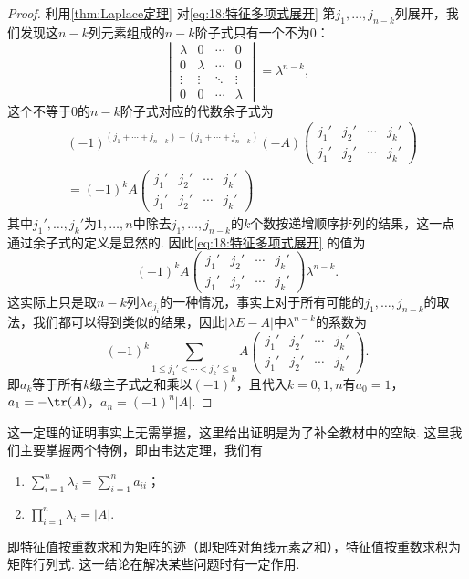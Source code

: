 \begin{proof}
    利用\autoref{thm:Laplace定理} 对\autoref{eq:18:特征多项式展开} 第$j_1,\ldots,j_{n-k}$列展开，我们发现这$n-k$列元素组成的$n-k$阶子式只有一个不为0：
    \[\begin{vmatrix}
            \lambda & 0       & \cdots & 0       \\
            0       & \lambda & \cdots & 0       \\
            \vdots  & \vdots  & \ddots & \vdots  \\
            0       & 0       & \cdots & \lambda
        \end{vmatrix}=\lambda^{n-k},\]
    这个不等于0的$n-k$阶子式对应的代数余子式为
    \begin{align*}
         & (-1)^{(j_1+\cdots+j_{n-k})+(j_1+\cdots+j_{n-k})}(-A)
        \begin{pmatrix}
            j_1' & j_2' & \cdots & j_k' \\
            j_1' & j_2' & \cdots & j_k'
        \end{pmatrix}                             \\
         & = (-1)^kA\begin{pmatrix}
                        j_1' & j_2' & \cdots & j_k' \\
                        j_1' & j_2' & \cdots & j_k'
                    \end{pmatrix}
    \end{align*}
    其中$j_1',\ldots,j_k'$为$1,\ldots,n$中除去$j_1,\ldots,j_{n-k}$的$k$个数按递增顺序排列的结果，这一点通过余子式的定义是显然的. 因此\autoref{eq:18:特征多项式展开} 的值为
    \[(-1)^kA\begin{pmatrix}
            j_1' & j_2' & \cdots & j_k' \\
            j_1' & j_2' & \cdots & j_k'
        \end{pmatrix}\lambda^{n-k}.\]
    这实际上只是取$n-k$列$\lambda e_{j_i}$的一种情况，事实上对于所有可能的$j_1,\ldots,j_{n-k}$的取法，我们都可以得到类似的结果，因此$|\lambda E-A|$中$\lambda^{n-k}$的系数为
    \[(-1)^k\sum\limits_{1\leqslant j_1'<\cdots<j_k'\leqslant n}A\begin{pmatrix}
            j_1' & j_2' & \cdots & j_k' \\
            j_1' & j_2' & \cdots & j_k'
        \end{pmatrix}.\]
    即$a_k$等于所有$k$级主子式之和乘以$(-1)^k$，且代入$k=0,1,n$有$a_0=1$，$a_1=-\tr(A)$，$a_n=(-1)^n|A|$.
\end{proof}

这一定理的证明事实上无需掌握，这里给出证明是为了补全教材中的空缺. 这里我们主要掌握两个特例，即由韦达定理，我们有
\begin{enumerate}
    \item $\displaystyle\sum_{i=1}^{n}\lambda_i=\sum_{i=1}^{n}a_{ii}$；

    \item $\displaystyle\prod_{i=1}^{n}\lambda_i=|A|$.
\end{enumerate}
即特征值按重数求和为矩阵的迹（即矩阵对角线元素之和），特征值按重数求积为矩阵行列式. 这一结论在解决某些问题时有一定作用.

